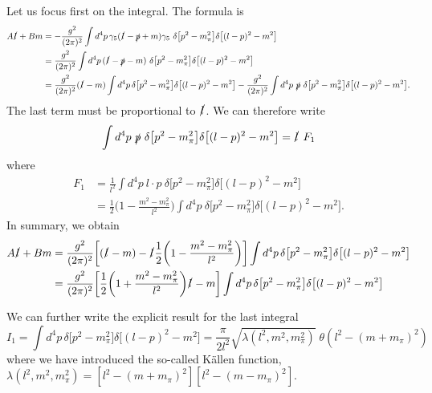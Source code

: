 \documentclass[preprintnumbers,floatfix,nofootinbib]{revtex4}
\begin{document}
Let us focus first on the integral. The formula is
\begin{equation}
\begin{split} 
A \slashed{l} + B m &= -\frac{g^2}{(2 \pi)^2} \int d^4 p\,  \gamma_5 
(\slashed{l}-\slashed{p} +m) \gamma_5 \ \delta\bigl[p^2 - m_{\pi}^2\bigr]
\delta\bigl[(l-p)^2 - m^2\bigr]
\\
&= \frac{g^2}{(2 \pi)^2} \int d^4 p\, 
(\slashed{l}-\slashed{p} -m)  \ 
\delta\bigl[p^2 - m_{\pi}^2\bigr]
\delta\bigl[(l-p)^2 - m^2\bigr]
\\
&=  \frac{g^2}{(2 \pi)^2} (\slashed{l} -m) \int d^4 p \, 
\delta\bigl[p^2 - m_{\pi}^2\bigr]
\delta\bigl[(l-p)^2 - m^2\bigr]
-
\frac{g^2}{(2 \pi)^2} 
\int d^4 p
\ \slashed{p} \ \delta\bigl[p^2 - m_{\pi}^2\bigr]
\delta\bigl[(l-p)^2 - m^2\bigr].
\end{split}
\end{equation} 
The last term must be proportional to $\slashed{l}$. We can therefore write
\begin{equation}
\int d^4 p
\ \slashed{p} \ \delta\bigl[p^2 - m_{\pi}^2\bigr]
\delta\bigl[(l-p)^2 - m^2\bigr]
=
\slashed{l} \ F_1 
\end{equation} 
where
\begin{equation}
\begin{split} 
F_1 &= \frac{1}{l^2}\int d^4 p \  l \cdot p \ \delta\bigl[p^2 - m_{\pi}^2\bigr]
\delta\bigl[(l-p)^2 - m^2\bigr]
\\
&= \frac{1}{2}\biggl(1-\frac{m^2-m_{\pi}^2}{l^2}\biggr)
\int d^4 p \  \delta\bigl[p^2 - m_{\pi}^2\bigr]
\delta\bigl[(l-p)^2 - m^2\bigr].
\end{split} 
\end{equation} 
In summary, we obtain
\begin{equation} 
\begin{split} 
A \slashed{l} + B m &= 
\frac{g^2}{(2 \pi)^2}\biggl[ (\slashed{l} -m) - \slashed{l} \frac{1}{2}\biggl(1-\frac{m^2-m_{\pi}^2}{l^2}\biggr) \biggr] \int d^4 p \, 
\delta\bigl[p^2 - m_{\pi}^2\bigr]
\delta\bigl[(l-p)^2 - m^2\bigr]
\\
&= \frac{g^2}{(2 \pi)^2}\biggl[
\frac{1}{2}\biggl(1+\frac{m^2-m_{\pi}^2}{l^2}\biggr) \slashed{l}
-m \biggr] \int d^4 p \, 
\delta\bigl[p^2 - m_{\pi}^2\bigr]
\delta\bigl[(l-p)^2 - m^2\bigr]
\end{split} 
\end{equation} 

We can further write the explicit result for the last integral
\begin{equation} 
I_1  = 
\int d^4 p \, 
\delta\bigl[p^2 - m_{\pi}^2\bigr]
\delta\bigl[(l-p)^2 - m^2\bigr]
 =  \frac{\pi}{2 l^2} \sqrt{ \lambda(l^2,m^2,m_{\pi}^2)}
	\;\theta(l^2 -(m+m_{\pi})^2) \,
\end{equation} 
where we have introduced the so-called K\"allen function, 
$\lambda(l^2,m^2,m_{\pi}^2)=[l^2 -(m+m_{\pi})^2][l^2 -(m-m_{\pi})^2]$.
\end{document}

